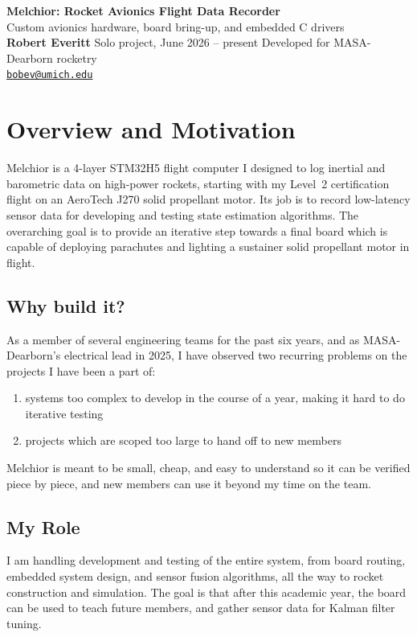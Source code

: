 \documentclass[10pt,letterpaper]{article}
\begin{document}
\begin{center}
{\LARGE\bfseries\color{accent} Melchior: Rocket Avionics Flight Data Recorder}\\[2pt]
{\large Custom avionics hardware, board bring-up, and embedded C drivers}\\[3pt]
\textbf{Robert Everitt} \textperiodcentered{} Solo project, June 2026 -- present \textperiodcentered{}
Developed for MASA-Dearborn rocketry\\[1pt]
\href{mailto:bobev@umich.edu}{\texttt{bobev@umich.edu}}
\end{center}
\vspace{-4pt}

\section{Overview and Motivation}
Melchior is a 4-layer STM32H5 flight computer I designed to log inertial and barometric data on high-power rockets, 
starting with my Level~2 certification flight on an AeroTech J270 solid propellant motor. Its job is to record low-latency sensor data for developing and testing state estimation algorithms. The overarching goal is to provide an iterative step towards a final board which is capable of deploying parachutes and lighting a sustainer solid propellant motor in flight.

\subsection{Why build it?} As a member of several engineering teams for the past six years, and as MASA-Dearborn's electrical lead in 2025, I have observed two recurring problems on the projects I have been a part of: 

\begin{enumerate}[leftmargin=1cm]
  \item systems too complex to develop in the course of a year, making it hard to do iterative testing
  \item projects which are scoped too large to hand off to new members
\end{enumerate}
Melchior is meant to be small, cheap, and easy to understand so it can be verified piece by piece, and new members can use it beyond my time on the team.

\subsection{My Role} I am handling development and testing of the entire system, from board routing, embedded system design, and sensor fusion algorithms, all the way to rocket construction and simulation. 
The goal is that after this academic year, the board can be used to teach future members, and gather sensor data for Kalman filter tuning.
\end{document}
